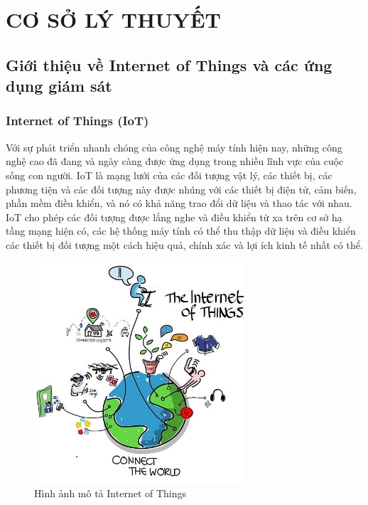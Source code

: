 
\chapter{CƠ SỞ LÝ THUYẾT}

\ifpdf
\graphicspath{{Chapter2/Figs/Raster/}{Chapter2/Figs/PDF/}{Chapter2/Figs/}{Chapter2/Figs/web/}}
\else
\graphicspath{{Chapter2/Figs/Vector/}{Chapter2/Figs/}}
\fi


\section{Giới thiệu về Internet of Things và các ứng dụng giám sát}
\subsection{Internet of Things (IoT)}\label{sec:xuhuongiot}
Với sự phát triển nhanh chóng của công nghệ máy tính hiện nay, những công nghệ cao đã đang và ngày càng được ứng dụng trong nhiều lĩnh vực của cuộc sống con người. IoT là mạng lưới của các đối tượng vật lý, các thiết bị, các phương tiện và các đối tượng này được nhúng với các thiết bị điện tử, cảm biến, phần mềm điều khiển, và nó có khả năng trao đổi dữ liệu và thao tác với nhau. IoT cho phép các đối tượng được lắng nghe và điều khiển từ xa trên cơ sở hạ tầng mạng hiện có, các hệ thống máy tính có thể thu thập dữ liệu và điều khiển các thiết bị đối tượng một cách hiệu quả, chính xác và lợi ích kinh tế nhất có thể. 
\begin{figure}[H] 
	\centering    
	\includegraphics[width=0.7\textwidth]{pic4}
	\caption[Hình ảnh mô tả Internet of Things]{Hình ảnh mô tả Internet of Things}
	\label{fig:pic4}
\end{figure}


